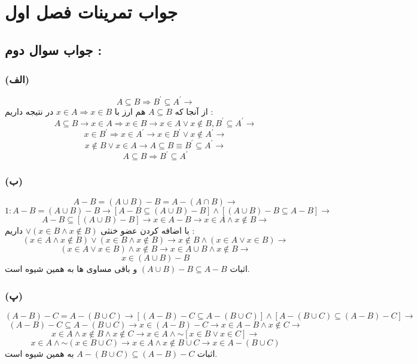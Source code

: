\documentclass{article}
\newcommand{\tildevar}{\mathord{\sim}}
\begin{document}
	\section*{ جواب تمرینات فصل اول}
        \subsection*{جواب سوال دوم :}
            \subsubsection*{(الف)}
                \[A \subseteq B \Rightarrow B^{\prime} \subseteq A^{\prime} \rightarrow\]
                از آنجا که $A \subseteq B$ هم ارز با $x \in A \Rightarrow x \in B$ در نتیجه داریم :\\
                \[A \subseteq B \rightarrow x \in A \Rightarrow x \in B \rightarrow x \in A \lor x \not \in B, B^{\prime} \subseteq A^{\prime} \rightarrow\]
                \[x \in B^{\prime} \Rightarrow x \in A^{\prime} \rightarrow x \in B^{\prime} \lor x \not \in A^{\prime} \rightarrow\]
                \[x \not \in B \lor x \in A \rightarrow A \subseteq B \equiv B^{\prime} \subseteq A^{\prime} \rightarrow\]
                \[A \subseteq B \Rightarrow B^{\prime} \subseteq A^{\prime}\]

            \subsubsection*{{(ب)}}
                \[A - B = (A \cup B) - B = A - (A \cap B) \rightarrow\]
                \[1: A - B = (A \cup B) - B \rightarrow [A - B \subseteq (A \cup B) - B] \land [(A \cup B) - B \subseteq A - B] \rightarrow\]
                \[A - B \subseteq [(A \cup B) - B] \rightarrow x \in A - B \rightarrow x \in A \land x \not \in B \rightarrow\]
                با اضافه کردن عضو خنثی $\lor (x \in B \land x \not \in B)$ داریم :\\
                \[(x \in A \land x \not \in B) \lor (x \in B \land x \not \in B) \rightarrow x \not \in B \land (x \in A \lor x \in B) \rightarrow\]
                \[(x \in A \lor x \in B) \land x \not \in B \rightarrow x \in A \cup B \land x \not \in B \rightarrow\]
                \[x \in (A \cup B) - B\]
                اثبات $(A \cup B) - B \subseteq A - B$ و باقی مساوی ها به همین شیوه است.

            \subsubsection*{(پ)}
                \[(A - B) - C = A - (B \cup C) \rightarrow [(A - B) - C \subseteq A - (B \cup C)] \land [A - (B \cup C) \subseteq (A - B) - C] \rightarrow\]
                \[(A - B) - C \subseteq A -  (B \cup C) \rightarrow x \in (A - B) - C \rightarrow x \in A - B \land x \not \in C \rightarrow\]
                \[x \in A \land x \not \in B \land x \not \in C \rightarrow x \in A \land \tildevar [x \in B \lor x \in C] \rightarrow\]
                \[x \in A \land \tildevar(x \in B \cup C) \rightarrow x \in A \land x \not \in B \cup C \rightarrow x \in A - (B \cup C)\]
                اثبات $A - (B \cup C) \subseteq (A - B) - C$ به همین شیوه است.
            
\end{document}
